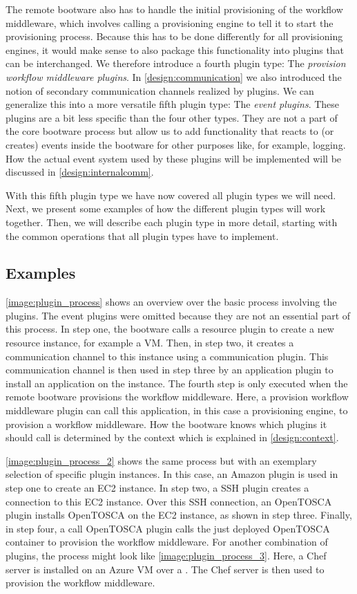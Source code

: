 The remote bootware also has to handle the initial provisioning of the workflow middleware, which involves calling a provisioning engine to tell it to start the provisioning process.
Because this has to be done differently for all provisioning engines, it would make sense to also package this functionality into plugins that can be interchanged.
We therefore introduce a fourth plugin type: The \textit{provision workflow middleware plugins}.
In \autoref{design:communication} we also introduced the notion of secondary communication channels realized by plugins.
We can generalize this into a more versatile fifth plugin type: The \textit{event plugins}.
These plugins are a bit less specific than the four other types.
They are not a part of the core bootware process but allow us to add functionality that reacts to (or creates) events inside the bootware for other purposes like, for example, logging.
How the actual event system used by these plugins will be implemented will be discussed in \autoref{design:internalcomm}.

With this fifth plugin type we have now covered all plugin types we will need.
Next, we present some examples of how the different plugin types will work together.
Then, we will describe each plugin type in more detail, starting with the common operations that all plugin types have to implement.

\subsection{Examples}

\autoref{image:plugin_process} shows an overview over the basic process involving the plugins.
The event plugins were omitted because they are not an essential part of this process.
In step one, the bootware calls a resource plugin to create a new resource instance, for example a VM.
Then, in step two, it creates a communication channel to this instance using a communication plugin.
This communication channel is then used in step three by an application plugin to install an application on the instance.
The fourth step is only executed when the remote bootware provisions the workflow middleware.
Here, a provision workflow middleware plugin can call this application, in this case a provisioning engine, to provision a workflow middleware.
How the bootware knows which plugins it should call is determined by the context which is explained in \autoref{design:context}.

\autoref{image:plugin_process_2} shows the same process but with an exemplary selection of specific plugin instances.
In this case, an Amazon plugin is used in step one to create an EC2 instance.
In step two, a SSH plugin creates a connection to this EC2 instance.
Over this SSH connection, an OpenTOSCA plugin installs OpenTOSCA on the EC2 instance, as shown in step three.
Finally, in step four, a call OpenTOSCA plugin calls the just deployed OpenTOSCA container to provision the workflow middleware.
For another combination of plugins, the process might look like \autoref{image:plugin_process_3}.
Here, a Chef server is installed on an Azure VM over a .
The Chef server is then used to provision the workflow middleware.

